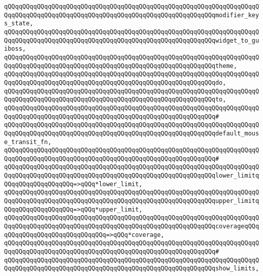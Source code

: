 \verb|qQQqqQQqqQQqqQQqqQQqqQQqqQQqqQQqqQQqqQQqqQQqqQQqqQQqqQQqqQQqqQQqqQQqqQQqqQQqqQQqqQQqqQQqqQQqqQQqqQQqqQQqqQQqqQQqqQQqqQQqqQQqqQQqmodifier_keys_state,|\newline
\verb|qQQqqQQqqQQqqQQqqQQqqQQqqQQqqQQqqQQqqQQqqQQqqQQqqQQqqQQqqQQqqQQqqQQqqQQqqQQqqQQqqQQqqQQqqQQqqQQqqQQqqQQqqQQqqQQqqQQqqQQqqQQqqQQqwidget_to_guiboss,|\newline
\verb|qQQqqQQqqQQqqQQqqQQqqQQqqQQqqQQqqQQqqQQqqQQqqQQqqQQqqQQqqQQqqQQqqQQqqQQqqQQqqQQqqQQqqQQqqQQqqQQqqQQqqQQqqQQqqQQqqQQqqQQqqQQqqQQqtheme,|\newline
\verb|qQQqqQQqqQQqqQQqqQQqqQQqqQQqqQQqqQQqqQQqqQQqqQQqqQQqqQQqqQQqqQQqqQQqqQQqqQQqqQQqqQQqqQQqqQQqqQQqqQQqqQQqqQQqqQQqqQQqqQQqqQQqqQQqdo,|\newline
\verb|qQQqqQQqqQQqqQQqqQQqqQQqqQQqqQQqqQQqqQQqqQQqqQQqqQQqqQQqqQQqqQQqqQQqqQQqqQQqqQQqqQQqqQQqqQQqqQQqqQQqqQQqqQQqqQQqqQQqqQQqqQQqqQQqto,|\newline
\verb|qQQqqQQqqQQqqQQqqQQqqQQqqQQqqQQqqQQqqQQqqQQqqQQqqQQqqQQqqQQqqQQqqQQqqQQqqQQqqQQqqQQqqQQqqQQqqQQqqQQqqQQqqQQqqQQqqQQqqQQqqQQqqQQq#|\newline
\verb|qQQqqQQqqQQqqQQqqQQqqQQqqQQqqQQqqQQqqQQqqQQqqQQqqQQqqQQqqQQqqQQqqQQqqQQqqQQqqQQqqQQqqQQqqQQqqQQqqQQqqQQqqQQqqQQqqQQqqQQqqQQqqQQqdefault_mouse_transit_fn,|\newline
\verb|qQQqqQQqqQQqqQQqqQQqqQQqqQQqqQQqqQQqqQQqqQQqqQQqqQQqqQQqqQQqqQQqqQQqqQQqqQQqqQQqqQQqqQQqqQQqqQQqqQQqqQQqqQQqqQQqqQQqqQQqqQQqqQQq#|\newline
\verb|qQQqqQQqqQQqqQQqqQQqqQQqqQQqqQQqqQQqqQQqqQQqqQQqqQQqqQQqqQQqqQQqqQQqqQQqqQQqqQQqqQQqqQQqqQQqqQQqqQQqqQQqqQQqqQQqqQQqqQQqqQQqqQQqlower_limitqQQqqQQqqQQqqQQqqQQq=>qQQq*lower_limit,|\newline
\verb|qQQqqQQqqQQqqQQqqQQqqQQqqQQqqQQqqQQqqQQqqQQqqQQqqQQqqQQqqQQqqQQqqQQqqQQqqQQqqQQqqQQqqQQqqQQqqQQqqQQqqQQqqQQqqQQqqQQqqQQqqQQqqQQqupper_limitqQQqqQQqqQQqqQQqqQQq=>qQQq*upper_limit,|\newline
\verb|qQQqqQQqqQQqqQQqqQQqqQQqqQQqqQQqqQQqqQQqqQQqqQQqqQQqqQQqqQQqqQQqqQQqqQQqqQQqqQQqqQQqqQQqqQQqqQQqqQQqqQQqqQQqqQQqqQQqqQQqqQQqqQQqcoverageqQQqqQQqqQQqqQQqqQQqqQQqqQQqqQQq=>qQQq*coverage,|\newline
\verb|qQQqqQQqqQQqqQQqqQQqqQQqqQQqqQQqqQQqqQQqqQQqqQQqqQQqqQQqqQQqqQQqqQQqqQQqqQQqqQQqqQQqqQQqqQQqqQQqqQQqqQQqqQQqqQQqqQQqqQQqqQQqqQQq#|\newline
\verb|qQQqqQQqqQQqqQQqqQQqqQQqqQQqqQQqqQQqqQQqqQQqqQQqqQQqqQQqqQQqqQQqqQQqqQQqqQQqqQQqqQQqqQQqqQQqqQQqqQQqqQQqqQQqqQQqqQQqqQQqqQQqqQQqshow_limits,|\newline
